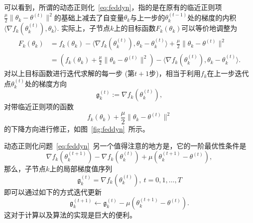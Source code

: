 

可以看到，所谓的动态正则化~\eqref{eq:feddyn}，指的是在原有的临近正则项$\frac{\mu}{2} \lVert \theta_k - \theta^{(t)} \rVert^2$的基础上减去了自变量$\theta_k$与上一步的$\theta_k^{(t-1)}$处的梯度的内积$\langle \nabla f_k(\theta_k^{(t)}), \theta_k \rangle.$ 实际上，子节点$k$上的目标函数$F_k(\theta_k)$可以等价地调整为
\begin{equation}
\label{eq:feddyn-adjusted}
\begin{aligned}
F_k(\theta_k) & = f_k(\theta_k) - \langle \nabla f_k(\theta_k^{(t)}), \theta_k - \theta_k^{(t)} \rangle + \frac{\mu}{2} \lVert \theta_k - \theta^{(t)} \rVert^2 \\
& = \left( f_k(\theta_k) + \frac{\mu}{2} \lVert \theta_k - \theta^{(t)} \rVert^2 \right) - \langle \nabla f_k(\theta_k^{(t)}), \theta_k - \theta_k^{(t)} \rangle.
\end{aligned}
\end{equation}
对以上目标函数进行迭代求解的每一步 (第$t+1$步)，相当于利用$f_k$在上一步迭代点$\theta_k^{(t)}$处的梯度方向
\begin{equation*}\mathfrak{g}_k^{(t)} := \nabla f_k(\theta_k^{(t)}),
\end{equation*}
对带临近正则项的函数
\begin{equation*}
f_k(\theta_k) + \frac{\mu}{2} \lVert \theta_k - \theta^{(t)} \rVert^2
\end{equation*}
的下降方向进行修正，如图~\ref{fig:feddyn}~所示。



动态正则化问题~\eqref{eq:feddyn}~另一个值得注意的地方是，它的一阶最优性条件是
\begin{equation}
\label{eq:feddyn-opt-cond}
\nabla f_k(\theta_k^{(t+1)}) - \nabla f_k(\theta_k^{(t)}) + \mu \left( \theta_k^{(t+1)} - \theta^{(t)} \right),
\end{equation}
那么，子节点$k$上的局部梯度值序列
\begin{equation*}
\mathfrak{g}_k^{(t)} = \nabla f_k(\theta_k^{(t)}), ~ t = 0, 1, \ldots, T
\end{equation*}
即可以通过如下的方式迭代更新
\begin{equation}
\label{eq:feddyn-grad-iter}
\mathfrak{g}_k^{(t+1)} \gets \mathfrak{g}_k^{(t)} - \mu (\theta_k^{(t+1)} - \theta^{(t)}).
\end{equation}
这对于计算以及算法的实现是巨大的便利。


